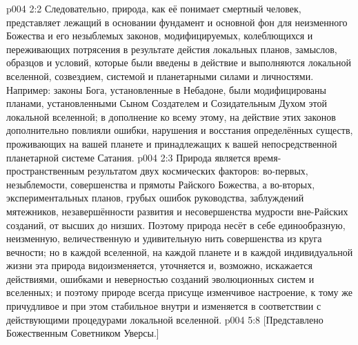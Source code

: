 \vs p004 2:2 Следовательно, природа, как её понимает смертный человек, представляет лежащий в основании фундамент и основной фон для неизменного Божества и его незыблемых законов, модифицируемых, колеблющихся и переживающих потрясения в результате дейстия локальных планов, замыслов, образцов и условий, которые были введены в действие и выполняются локальной вселенной, созвездием, системой и планетарными силами и личностями. Например: законы Бога, установленные в Небадоне, были модифицированы планами, установленными Сыном Создателем и Созидательным Духом этой локальной вселенной; в дополнение ко всему этому, на действие этих законов дополнительно повлияли ошибки, нарушения и восстания определённых существ, проживающих на вашей планете и принадлежащих к вашей непосредственной планетарной системе Сатания.
\vs p004 2:3 \pc Природа является время\hyp{}пространственным результатом двух космических факторов: во\hyp{}первых, незыблемости, совершенства и прямоты Райского Божества, а во\hyp{}вторых, экспериментальных планов, грубых ошибок руководства, заблуждений мятежников, незавершённости развития и несовершенства мудрости вне\hyp{}Райских созданий, от высших до низших. Поэтому природа несёт в себе единообразную, неизменную, величественную и удивительную нить совершенства из круга вечности; но в каждой вселенной, на каждой планете и в каждой индивидуальной жизни эта природа видоизменяется, уточняется и, возможно, искажается действиями, ошибками и неверностью созданий эволюционных систем и вселенных; и поэтому природе всегда присуще изменчивое настроение, к тому же причудливое и при этом стабильное внутри и изменяется в соответствии с действующими процедурами локальной вселенной.
\vsetoff
\vs p004 5:8 [Представлено Божественным Советником Уверсы.]
\quizlink

